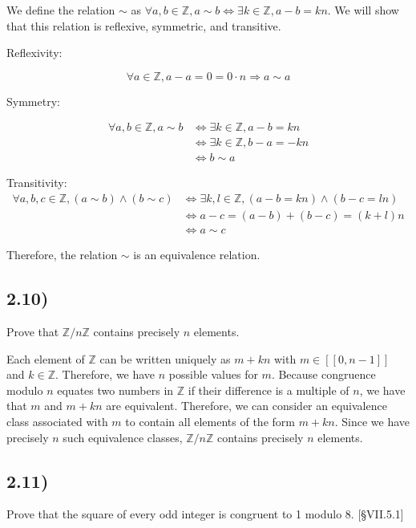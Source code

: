 We define the relation $\sim$ as $\forall a, b \in \mathbb{Z}, a \sim b \Leftrightarrow \exists k \in \mathbb{Z}, a - b = kn$. We will show that this relation is reflexive, symmetric, and transitive.

Reflexivity: 

$$\forall a \in \mathbb{Z}, a - a = 0 = 0 \cdot n \Rightarrow a \sim a$$

Symmetry:

$$
\begin{aligned}
\forall a, b \in \mathbb{Z}, a \sim b
&\Leftrightarrow \exists k \in \mathbb{Z}, a - b = kn \\
&\Leftrightarrow \exists k \in \mathbb{Z}, b - a = -kn \\
&\Leftrightarrow b \sim a
\end{aligned}
$$


Transitivity:
$$
\begin{aligned}
\forall a, b, c \in \mathbb{Z}, (a \sim b) \land (b \sim c)
&\Leftrightarrow \exists k, l \in \mathbb{Z}, (a - b = kn) \land (b - c = ln) \\
&\Leftrightarrow a - c = (a - b) + (b - c) = (k + l)n \\
&\Leftrightarrow a \sim c
\end{aligned}
$$

Therefore, the relation $\sim$ is an equivalence relation.


\subsection*{2.10)}

Prove that $\mathbb{Z}/n\mathbb{Z}$ contains precisely $n$ elements.

Each element of $\mathbb{Z}$ can be written uniquely as $m + kn$ with $m \in [[0, n-1]]$ and $k \in \mathbb{Z}$. Therefore, we have $n$ possible values for $m$. Because congruence modulo $n$ equates two numbers in $\mathbb{Z}$ if their difference is a multiple of $n$, we have that $m$ and $m + kn$ are equivalent. Therefore, we can consider an equivalence class associated with $m$ to contain all elements of the form $m + kn$. Since we have precisely $n$ such equivalence classes, $\mathbb{Z}/n\mathbb{Z}$ contains precisely $n$ elements.


\subsection*{2.11)}

Prove that the square of every odd integer is congruent to 1 modulo 8. [§VII.5.1]

